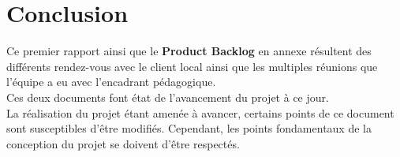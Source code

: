 \chapter{Conclusion}

Ce premier rapport ainsi que le \textbf{Product Backlog} en annexe résultent des différents rendez-vous avec le client local ainsi que les multiples réunions que l'équipe a eu avec l'encadrant pédagogique.\\
Ces deux documents font état de l'avancement du projet à ce jour.\\

La réalisation du projet étant amenée à avancer, certains points de ce document sont susceptibles d'être modifiés. Cependant, les points fondamentaux de la conception du projet se doivent d'être respectés.\\


